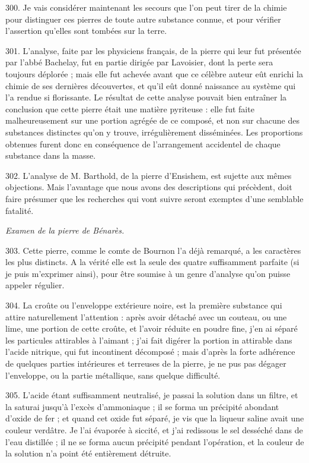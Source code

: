 \documentclass[a4paper, 11pt, oneside, polutonikogreek, french]{article}
\begin{document}
300. Je vais considérer maintenant les secours que l'on peut tirer de la chimie pour distinguer ces pierres de toute autre substance connue, et pour vérifier l'assertion qu'elles sont tombées sur la terre.

301. L'analyse, faite par les physiciens français, de la pierre qui leur fut présentée par l'abbé Bachelay, fut en partie dirigée par Lavoisier, dont la perte sera toujours déplorée ; mais elle fut achevée avant que ce célèbre auteur eût enrichi la chimie de ses dernières découvertes, et qu'il eût donné naissance au système qui l'a rendue si florissante. Le résultat de cette analyse pouvait bien entraîner la conclusion que cette pierre était une matière pyriteuse : elle fut faite malheureusement sur une portion agrégée de ce composé, et non sur chacune des substances distinctes qu'on y trouve, irrégulièrement disséminées. Les proportions obtenues furent donc en conséquence de l'arrangement accidentel de chaque substance dans la masse.

302. L'analyse de M. Barthold, de la pierre d'Ensishem, est sujette aux mêmes objections. Mais l'avantage que nous avons des descriptions qui précèdent, doit faire présumer que les recherches qui vont suivre seront exemptes d'une semblable fatalité.

\begin{center}
\emph{Examen de la pierre de Bénarès.}
\end{center}

303. Cette pierre, comme le comte de Bournon l'a déjà remarqué, a les caractères les plus distincts. A la vérité elle est la seule des quatre suffisamment parfaite (si je puis m'exprimer ainsi), pour être soumise à un genre d'analyse qu'on puisse appeler régulier.

304. La croûte ou l'enveloppe extérieure noire, est la première substance qui attire naturellement l'attention : après avoir détaché avec un couteau, ou une lime, une portion de cette croûte, et l'avoir réduite en poudre fine, j'en ai séparé les particules attirables à l'aimant ; j'ai fait digérer la portion in attirable dans l'acide nitrique, qui fut incontinent décomposé ; mais d'après la forte adhérence de quelques parties intérieures et terreuses de la pierre, je ne pus pas dégager l'enveloppe, ou la partie métallique, sans quelque difficulté.

305. L'acide étant suffisamment neutralisé, je passai la solution dans un filtre, et la saturai jusqu'à l'excès d'ammoniaque ; il se forma un précipité abondant d'oxide de fer ; et quand cet oxide fut séparé, je vis que la liqueur saline avait une couleur verdâtre. Je l'ai évaporée à siccité, et j'ai redissous le sel desséché dans de l'eau distillée ; il ne se forma aucun précipité pendant l'opération, et la couleur de la solution n'a point été entièrement détruite.
\end{document}
